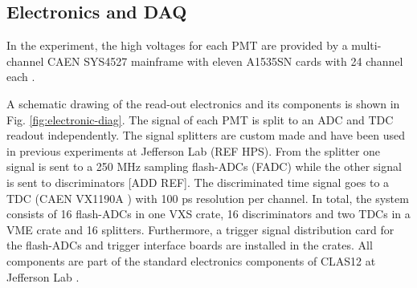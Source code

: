 \documentclass[3p,final,twocolumn]{elsarticle}
\begin{document}
\subsection{Electronics and DAQ}
In the experiment, the high voltages for each PMT are provided by a multi-channel CAEN SYS4527 mainframe with eleven A1535SN cards with 24 channel each \cite{caen-hvframe,caen-hvcard}.

A schematic drawing of the read-out electronics and its components is shown in Fig. \ref{fig:electronic-diag}. The signal of each PMT is split to an ADC and TDC readout independently. 
The signal splitters are custom made and have been used in previous experiments at Jefferson Lab (REF HPS).
From the splitter one signal is sent to a 250 \si{\mega\hertz} sampling flash-ADCs (FADC) \cite{fadc-manual} while the other signal is sent to discriminators [ADD REF].
The discriminated time signal goes to a TDC (CAEN VX1190A \cite{caen-tdc}) with 100 ps resolution per channel. 
In total, the system consists of 16 flash-ADCs in one VXS crate, 16 discriminators and two TDCs in a VME crate and 16 splitters.  Furthermore, a trigger signal distribution card for the flash-ADCs and trigger interface boards are installed in the crates. All components are part of the standard electronics components of CLAS12 at Jefferson Lab \cite{clas12-daq, clas12-trigger}.
\end{document}
